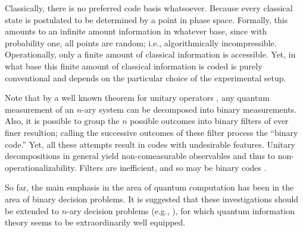 Classically, there is no preferred code basis whatsoever.
Because every classical state is postulated to be determined by a
point in phase space.
Formally, this amounts to an infinite amount information in whatever base,
since
with probability one, all points are random; i.e., algorithmically incompressible.
Operationally, only a finite amount of classical information is accessible.
Yet, in what base this finite amount of classical information is coded
is purely conventional and depends on the particular choice of the experimental setup.

Note that
by a well known theorem for unitary operators
\cite{murnaghan},
any quantum measurement of an $n$-ary system can be decomposed
into binary measurements.
Also, it is possible to group the $n$ possible outcomes into binary filters of
ever finer resultion; calling the successive outcomes of these filter process
the ``binary code.''
Yet, all these attempts result in codes with undesirable features.
Unitary decompositions in general yield non-comeasurable observables and thus to
non-operationalizability. Filters are inefficient, and so may be binary codes
\cite{Cal-Cam-96}.

So far, the main emphasis in the area of quantum computation
has been in the area of binary decision problems.
It is suggested that these investigations should be extended to
$n$-ary decision problems (e.g., \cite[pp. 332-340]{kleene-52}),
for which quantum information theory seems
to be extraordinarily well equipped.






%


